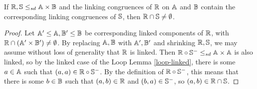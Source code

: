 \documentclass[letterpaper,11pt]{article}
\begin{document}
\begin{lem} If $\mathbb{R}, \mathbb{S} \le_{sd} \mathbb{A} \times \mathbb{B}$ and the linking congruences of $\mathbb{R}$ on $\mathbb{A}$ and $\mathbb{B}$ contain the corresponding linking congruences of $\mathbb{S}$, then $\mathbb{R} \cap \mathbb{S} \ne \emptyset$.
\end{lem}
\begin{proof} Let $\mathbb{A}' \le \mathbb{A}, \mathbb{B}' \le \mathbb{B}$ be corresponding linked components of $\mathbb{R}$, with $\mathbb{R} \cap (\mathbb{A}'\times\mathbb{B}') \ne \emptyset$. By replacing $\mathbb{A},\mathbb{B}$ with $\mathbb{A}',\mathbb{B}'$ and shrinking $\mathbb{R},\mathbb{S}$, we may assume without loss of generality that $\mathbb{R}$ is linked. Then $\mathbb{R} \circ \mathbb{S}^{-} \le_{sd} \mathbb{A} \times \mathbb{A}$ is also linked, so by the linked case of the Loop Lemma \ref{loop-linked}, there is some $a \in \mathbb{A}$ such that $(a,a) \in \mathbb{R} \circ \mathbb{S}^-$. By the definition of $\mathbb{R} \circ \mathbb{S}^-$, this means that there is some $b \in \mathbb{B}$ such that $(a,b) \in \mathbb{R}$ and $(b,a) \in \mathbb{S}^-$, so $(a,b) \in \mathbb{R}\cap \mathbb{S}$.
\end{proof}
\end{document}
